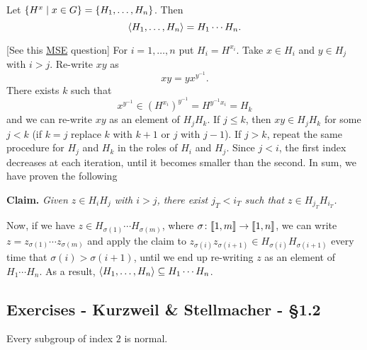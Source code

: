 \begin{exr}\label{exercise-1.1.13}
    Let\/ $\{H^x\mid x\in G\} = \{H_1,\dots, H_n\}$. Then
    $$
        \langle H_1,\dots,H_n\rangle = H_1\cdots H_n.
    $$
\end{exr}

\begin{solution} {[See this \href{https://math.stackexchange.com/q/4781892/269050}{MSE} question]} For $i=1,\dots, n$ put $H_i=H^{x_i}$. Take $x\in H_i$ and $y\in H_j$ with $i>j$. Re-write $xy$ as
$$
    xy=yx^{y^{-1}}.
$$
There exists $k$ such that
$$
    x^{y^{-1}}\in(H^{x_i})^{y^{-1}}=H^{y^{-1}x_i}=H_k
$$
and we can re-write $xy$ as an element of $H_jH_k$. If $j\le k$, then $xy\in H_jH_k$ for some $j<k$ (if $k=j$ replace $k$ with $k+1$ or $j$ with $j-1$). If $j>k$, repeat the same procedure for $H_j$ and $H_k$ in the roles of $H_i$ and $H_j$. Since $j<i$, the first index decreases at each iteration, until it becomes smaller than the second. In sum, we have proven the following

\textbf{Claim.} \textit{Given $z\in H_iH_j$ with $i>j$, there exist $j_T<i_T$ such that $z\in H_{j_T}H_{i_T}$.}

Now, if we have $z\in H_{\sigma(1)}\cdots H_{\sigma(m)}$, where $\sigma\colon\llbracket1,m\rrbracket\to\llbracket1,n\rrbracket$, we can write $z=z_{\sigma(1)}\cdots z_{\sigma(m)}$ and apply the claim to $z_{\sigma(i)}z_{\sigma(i+1)}\in H_{\sigma(i)}H_{\sigma(i+1)}$ every time that $\sigma(i)>\sigma(i+1)$, until we end up re-writing $z$ as an element of $H_1\cdots H_n$. As a result, $\langle H_1,\dots,H_n\rangle\subseteq H_1\cdots H_n$.  \end{solution}


\subsection{Exercises - Kurzweil \& Stellmacher - \S 1.2}

\begin{exr}\label{exr:index-2-is-normal}
    Every subgroup of index\/ $2$ is normal.
\end{exr}

